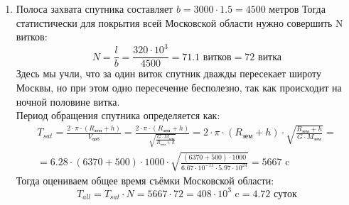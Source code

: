 \begin{enumerate}
    \item Полоса захвата спутника составляет $b=3000\cdot1.5=4500\text{ метров}$
    Тогда статистически для покрытия всей Московской области нужно 	совершить N витков:
    $$N=\frac{l}{b}=\frac{320\cdot10^3}{4500}=71.1\text{ витков}=72\text{ витка}$$
    Здесь мы учли, что за один виток спутник дважды пересекает широту Москвы, но при этом одно пересечение бесполезно, так как происходит на ночной половине витка.\\
    Период обращения спутника определяется как:
    \begin{eqnarray}\nonumber
    T_{sat}=\frac{2\cdot\pi\cdot(R_\text{зем}+h)}{V_\text{орб}}=\frac{2\cdot\pi\cdot(R_\text{зем}+h)}{\sqrt{\frac{G\cdot M_\text{зем}}{R_\text{зем}+h}}}=2\cdot\pi\cdot(R_\text{зем}+h)\cdot\sqrt{\frac{R_\text{зем}+h}{G\cdot M_\text{зем}}}=
    \\\nonumber
    =6.28\cdot(6370+500)\cdot1000\cdot\sqrt{\frac{(6370+500)\cdot1000}{6.67\cdot10^{-11}\cdot5.97\cdot10^{24}}}=5667\text{ c}
    \end{eqnarray}
    Тогда оцениваем общее время съёмки Московской области:
    $$T_{all}=T_{sat}\cdot N=5667\cdot72=408\cdot10^3\text{ c}=4.72\text{ суток}$$
    
    \end{enumerate}